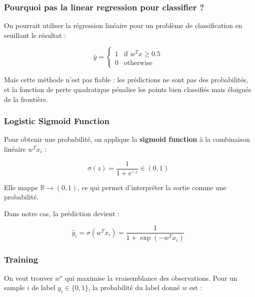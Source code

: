 \documentclass[11pt,a4paper,openany]{book}
\begin{document}
\vspace{0.6cm}

\subsubsection{Pourquoi pas la linear regression pour classifier ?}

On pourrait utiliser la régression linéaire pour un problème de classification en seuillant le résultat :

\[
\hat{y} =
\begin{cases}
1 & \text{if } w^T x \geq 0.5 \\
0 & \text{otherwise}
\end{cases}
\]

Mais cette méthode n'est pas fiable : les prédictions ne sont pas des probabilités, et la fonction de perte quadratique pénalise les points bien classifiés mais éloignés de la frontière.

\vspace{0.8cm}

\subsubsection{Logistic Sigmoid Function}

Pour obtenir une probabilité, on applique la \textbf{sigmoid function} à la combinaison linéaire $w^T x_i$ :

\vspace{0.4cm}

\begin{defnbox}[title=Sigmoid function]
\[
\sigma(z) = \frac{1}{1 + e^{-z}} \in (0, 1)
\]

Elle mappe $\mathbb{R} \to (0,1)$, ce qui permet d'interpréter la sortie comme une probabilité.
\end{defnbox}

\vspace{0.4cm}

Dans notre cas, la prédiction devient :

\[
\hat{y}_i = \sigma(w^T x_i) = \frac{1}{1 + \exp(-w^T x_i)}
\]

\vspace{0.8cm}

\subsubsection{Training}

On veut trouver $w^\star$ qui maximise la vraisemblance des observations. Pour un sample $i$ de label $y_i \in \{0,1\}$, la probabilité du label donné $w$ est :
\end{document}
